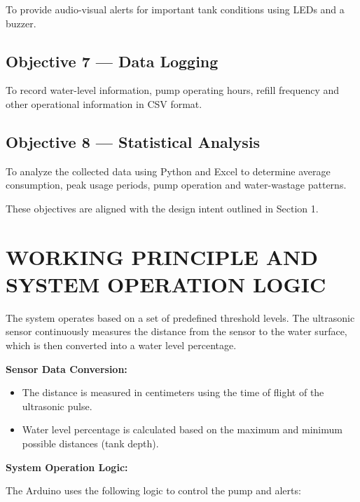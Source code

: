 \documentclass[12pt,a4paper]{article}
\begin{document}
To provide audio-visual alerts for important tank conditions using LEDs and a buzzer.

\subsection*{Objective 7 --- Data Logging}

To record water-level information, pump operating hours, refill frequency and other operational information in CSV format.

\subsection*{Objective 8 --- Statistical Analysis}

To analyze the collected data using Python and Excel to determine average consumption, peak usage periods, pump operation and water-wastage patterns.

These objectives are aligned with the design intent outlined in Section 1.


\section{WORKING PRINCIPLE AND SYSTEM OPERATION LOGIC}

The system operates based on a set of predefined threshold levels. The ultrasonic sensor continuously measures the distance from the sensor to the water surface, which is then converted into a water level percentage.

\textbf{Sensor Data Conversion:}

\begin{itemize}
    \item The distance is measured in centimeters using the time of flight of the ultrasonic pulse.
    \item Water level percentage is calculated based on the maximum and minimum possible distances (tank depth).
\end{itemize}

\textbf{System Operation Logic:}

The Arduino uses the following logic to control the pump and alerts:

\end{document}
